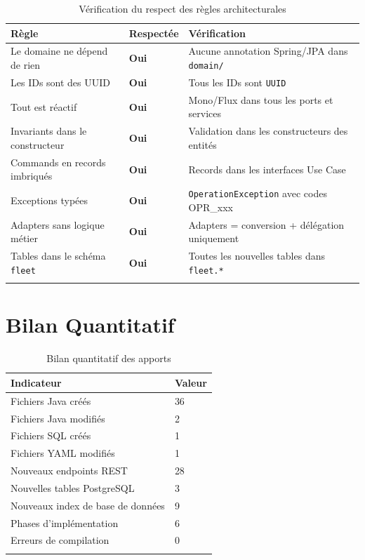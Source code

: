 \documentclass[12pt,a4paper]{report}
\begin{document}
\begin{longtable}{p{7cm}p{2cm}p{4cm}}
\toprule
\textbf{Règle} & \textbf{Respectée} & \textbf{Vérification} \\
\midrule
\endhead
Le domaine ne dépend de rien & \textcolor{fleetsuccess}{\textbf{Oui}} & Aucune annotation Spring/JPA dans \texttt{domain/} \\
Les IDs sont des UUID & \textcolor{fleetsuccess}{\textbf{Oui}} & Tous les IDs sont \texttt{UUID} \\
Tout est réactif & \textcolor{fleetsuccess}{\textbf{Oui}} & Mono/Flux dans tous les ports et services \\
Invariants dans le constructeur & \textcolor{fleetsuccess}{\textbf{Oui}} & Validation dans les constructeurs des entités \\
Commands en records imbriqués & \textcolor{fleetsuccess}{\textbf{Oui}} & Records dans les interfaces Use Case \\
Exceptions typées & \textcolor{fleetsuccess}{\textbf{Oui}} & \texttt{OperationException} avec codes OPR\_xxx \\
Adapters sans logique métier & \textcolor{fleetsuccess}{\textbf{Oui}} & Adapters = conversion + délégation uniquement \\
Tables dans le schéma \texttt{fleet} & \textcolor{fleetsuccess}{\textbf{Oui}} & Toutes les nouvelles tables dans \texttt{fleet.*} \\
\bottomrule
\caption{Vérification du respect des règles architecturales}
\end{longtable}

\section{Bilan Quantitatif}

\begin{longtable}{p{7cm}p{6cm}}
\toprule
\textbf{Indicateur} & \textbf{Valeur} \\
\midrule
\endhead
Fichiers Java créés & 36 \\
Fichiers Java modifiés & 2 \\
Fichiers SQL créés & 1 \\
Fichiers YAML modifiés & 1 \\
Nouveaux endpoints REST & 28 \\
Nouvelles tables PostgreSQL & 3 \\
Nouveaux index de base de données & 9 \\
Phases d'implémentation & 6 \\
Erreurs de compilation & 0 \\
\bottomrule
\caption{Bilan quantitatif des apports}
\end{longtable}
\end{document}

